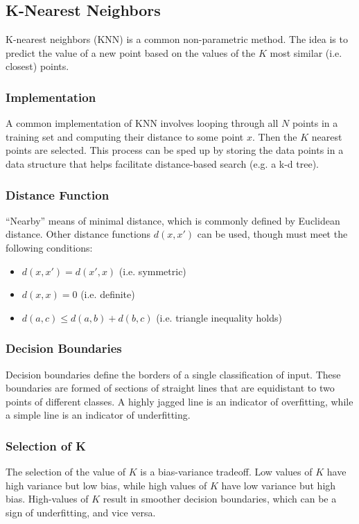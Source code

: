 \documentclass[12pt]{article}
\begin{document}
    \subsection{K-Nearest Neighbors}
        K-nearest neighbors (KNN) is a common non-parametric method. The idea is to predict the value of a new point based on the values of the $K$ most similar
        (i.e. closest) points.

        \subsubsection{Implementation}
            A common implementation of KNN involves looping through all $N$ points in a training set and computing their distance to some point $x$. Then the $K$ nearest
            points are selected. This process can be sped up by storing the data points in a data structure that helps facilitate distance-based search (e.g. a k-d tree).

        \subsubsection{Distance Function}
            ``Nearby'' means of minimal distance, which is commonly defined by Euclidean distance. Other distance functions $d(x, x')$ can be used, though must meet
            the following conditions:
            \begin{itemize}
              \item $d(x, x') = d(x', x)$ (i.e. symmetric)
              \item $d(x, x) = 0$ (i.e. definite)
              \item $d(a, c) \leq d(a, b) + d(b, c)$ (i.e. triangle inequality holds)
            \end{itemize}

        \subsubsection{Decision Boundaries}
            Decision boundaries define the borders of a single classification of input. These boundaries are formed of sections of straight lines that are equidistant
            to two points of different classes. A highly jagged line is an indicator of overfitting, while a simple line is an indicator of underfitting.

        \subsubsection{Selection of K}
            The selection of the value of $K$ is a bias-variance tradeoff. Low values of $K$ have high variance but low bias, while high values of $K$ have low variance
            but high bias. High-values of $K$ result in smoother decision boundaries, which can be a sign of underfitting, and vice versa.
\end{document}
